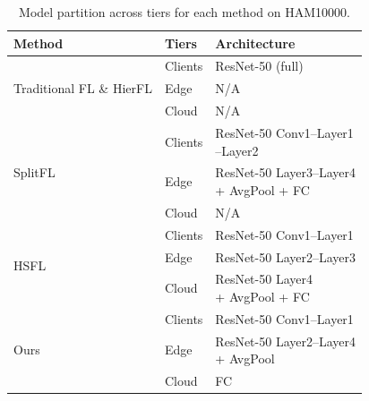 \documentclass[letterpaper]{article} %
\begin{document}
        \begin{table}
            \centering
            \small
            \begin{tabular}{l|l|l}
            \hline
            \textbf{Method} & \textbf{Tiers} & \textbf{Architecture} \\
            \hline
            \multirow{3}{*}{Traditional FL \& HierFL} 
            & Clients & ResNet-50 (full) \\
            & Edge & N/A \\
            & Cloud & N/A \\
            \hline
            \multirow{3}{*}{SplitFL} 
            & Clients & \makecell[l]{ResNet-50 Conv1--Layer1 \\ --Layer2} \\
            & Edge & \makecell[l]{ResNet-50 Layer3--Layer4 \\ + AvgPool + FC} \\
            & Cloud & N/A \\
            \hline
            \multirow{3}{*}{HSFL} 
            & Clients & ResNet-50 Conv1--Layer1 \\
            & Edge & ResNet-50 Layer2--Layer3 \\
            & Cloud & \makecell[l]{ResNet-50 Layer4 \\ + AvgPool + FC} \\
            \hline
            \multirow{3}{*}{Ours} 
            & Clients & ResNet-50 Conv1--Layer1 \\
            & Edge & \makecell[l]{ResNet-50 Layer2--Layer4 \\ + AvgPool} \\
            & Cloud & FC \\ \hline
            \end{tabular}
            \caption{Model partition across tiers for each method on HAM10000.}
            \label{tab:model_ham10000}
        \end{table}
        
\end{document}
